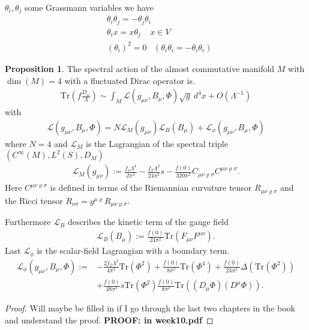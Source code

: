 \documentclass[a4paper]{article}
\theoremstyle{definition}
\theoremstyle{definition}
\theoremstyle{definition}
\theoremstyle{theorem}
\theoremstyle{theorem}
\theoremstyle{theorem}
\newtheorem{proposition}{Proposition}
\begin{document}
$\theta _i, \theta _j$ some Grassmann variables we have
\begin{align}
    &\theta _i \theta _j = -\theta _j \theta _i \\
    &\theta _i x = x\theta _j \;\;\;\; x\in V \\
    &(\theta_i)^2 = 0 \;\;\; (\theta _i \theta _i = -\theta _i \theta _i)
\end{align}
\begin{proposition}
    The spectral action of the almost commutative manifold $M$ with $\dim(M)
    =4$ with a fluctuated Dirac operator is.
    \begin{align}
        \text{Tr}(f\frac{D_\omega}{\Lambda}) \sim \int_M \mathcal{L}(g_{\mu\nu},
         B_\mu, \Phi) \sqrt{g}\ d^4x + O(\Lambda^{-1})
    \end{align}
    with
    \begin{align}
        \mathcal{L}(g_{\mu\nu}, B_\mu, \Phi) =
        N\mathcal{L}_M(g_{\mu\nu})
        \mathcal{L}_B(B_\mu)+
        \mathcal{L}_\phi(g_{\mu\nu}, B_\mu, \Phi)
    \end{align}
    where $N=4$ and $\mathcal{L}_M$ is the Lagrangian of the spectral triple
    $(C^\infty(M) , L^2(S), D_M)$
    \begin{align}\label{lagr}
        \mathcal{L}_M(g_{\mu\nu}) := \frac{f_4 \Lambda ^4}{2\pi^2} -
        \frac{f_2 \Lambda^2}{24\pi ^2}s - \frac{f(0)}{320\pi^2} C_{\mu\nu
        \varrho \sigma}C^{\mu\nu \varrho \sigma}.
    \end{align}
    Here $C^{\mu\nu \varrho \sigma}$ is defined in terms of the Riemannian
    curvature tensor $R_{\mu\nu \varrho \sigma}$ and the Ricci tensor
    $R_{\nu\sigma} = g^{\mu\varrho} R_{\mu\nu \varrho\sigma}$.


    Furthermore $\mathcal{L}_B$ describes the kinetic term of the gauge field
    \begin{align}
        \mathcal{L}_B(B_\mu) := \frac{f(0)}{24\pi^2}
        \text{Tr}(F_{\mu\nu}F^{\mu\nu}).
    \end{align}
    Last $\mathcal{L}_\phi$ is the scalar-field Lagrangian with a boundary
    term.
    \begin{align}
        \mathcal{L}_\phi(g_{\mu\nu}, B_\mu, \Phi) :=
        &-\frac{2f_2\Lambda^2}{4\pi^2}\text{Tr}(\Phi^2) + \frac{f(0)}{8\pi^2}
        \text{Tr}(\Phi^4) + \frac{f(0)}{24\pi^2} \Delta(\text{Tr}(\Phi^2))\\
        &+ \frac{f(0)}{48\pi^2}s\text{Tr}(\Phi^2)
        \frac{f(0)}{8\pi^2}\text{Tr}((D_\mu \Phi)(D^\mu \Phi)).
    \end{align}
\end{proposition}
\begin{proof}
    Will maybe be filled in if I go through the last two chapters in the
    book and understand the proof.
    \textbf{PROOF: in week10.pdf}
\end{proof}
\end{document}
